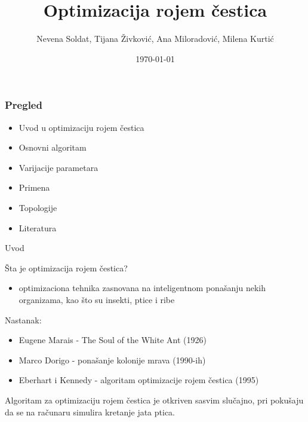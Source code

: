 \documentclass{beamer}
\title[Optimizacija rojem čestica]{Optimizacija rojem čestica}
\author{Nevena Soldat, Tijana Živković, Ana Miloradović, Milena Kurtić}
\institute{Matematički fakultet, Univerzitet u Beogradu}
\date{\today}
\begin{document}
\frame{\titlepage}

\begin{frame}
\frametitle{Pregled}
\begin{itemize}
    \item{Uvod u optimizaciju rojem čestica}
    \item{Osnovni algoritam}
    \item{Varijacije parametara}
    \item{Primena}
    \item{Topologije}
    \item{Literatura}
\end{itemize}

\end{frame}

\begin{frame}{Uvod}

Šta je optimizacija rojem čestica?
\begin{itemize}
    \item optimizaciona tehnika zasnovana na inteligentnom ponašanju nekih organizama, kao što su insekti, ptice i ribe

\end{itemize}

Nastanak:
\begin{itemize}
    \item Eugene Marais - The Soul of the White Ant (1926)
    \item Marco Dorigo - ponašanje kolonije mrava (1990-ih) 
    \item Eberhart i Kennedy - algoritam optimizacije rojem čestica (1995)
\end{itemize}

Algoritam za optimizaciju rojem čestica je otkriven sasvim slučajno, pri pokušaju da se na računaru simulira kretanje jata ptica.
\end{frame}
\end{document}
